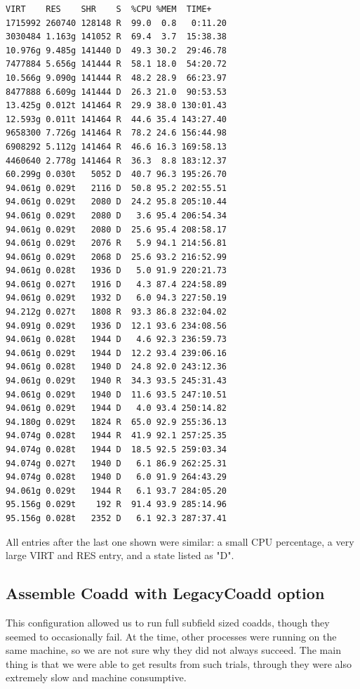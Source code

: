 \documentclass[DM,toc]{lsstdoc}
\begin{document}
\begin{small}
\begin{verbatim}
VIRT    RES    SHR    S  %CPU %MEM  TIME+
1715992 260740 128148 R  99.0  0.8   0:11.20
3030484 1.163g 141052 R  69.4  3.7  15:38.38
10.976g 9.485g 141440 D  49.3 30.2  29:46.78
7477884 5.656g 141444 R  58.1 18.0  54:20.72
10.566g 9.090g 141444 R  48.2 28.9  66:23.97
8477888 6.609g 141444 D  26.3 21.0  90:53.53
13.425g 0.012t 141464 R  29.9 38.0 130:01.43
12.593g 0.011t 141464 R  44.6 35.4 143:27.40
9658300 7.726g 141464 R  78.2 24.6 156:44.98
6908292 5.112g 141464 R  46.6 16.3 169:58.13
4460640 2.778g 141464 R  36.3  8.8 183:12.37
60.299g 0.030t   5052 D  40.7 96.3 195:26.70
94.061g 0.029t   2116 D  50.8 95.2 202:55.51
94.061g 0.029t   2080 D  24.2 95.8 205:10.44
94.061g 0.029t   2080 D   3.6 95.4 206:54.34
94.061g 0.029t   2080 D  25.6 95.4 208:58.17
94.061g 0.029t   2076 R   5.9 94.1 214:56.81
94.061g 0.029t   2068 D  25.6 93.2 216:52.99
94.061g 0.028t   1936 D   5.0 91.9 220:21.73
94.061g 0.027t   1916 D   4.3 87.4 224:58.89
94.061g 0.029t   1932 D   6.0 94.3 227:50.19
94.212g 0.027t   1808 R  93.3 86.8 232:04.02
94.091g 0.029t   1936 D  12.1 93.6 234:08.56
94.061g 0.028t   1944 D   4.6 92.3 236:59.73
94.061g 0.029t   1944 D  12.2 93.4 239:06.16
94.061g 0.028t   1940 D  24.8 92.0 243:12.36
94.061g 0.029t   1940 R  34.3 93.5 245:31.43
94.061g 0.029t   1940 D  11.6 93.5 247:10.51
94.061g 0.029t   1944 D   4.0 93.4 250:14.82
94.180g 0.029t   1824 R  65.0 92.9 255:36.13
94.074g 0.028t   1944 R  41.9 92.1 257:25.35
94.074g 0.028t   1944 D  18.5 92.5 259:03.34
94.074g 0.027t   1940 D   6.1 86.9 262:25.31
94.074g 0.028t   1940 D   6.0 91.9 264:43.29
94.061g 0.029t   1944 R   6.1 93.7 284:05.20
95.156g 0.029t    192 R  91.4 93.9 285:14.96
95.156g 0.028t   2352 D   6.1 92.3 287:37.41
\end{verbatim}
\end{small}

All entries after the last one shown were similar: a small CPU percentage, a very large VIRT and RES entry, and a state listed as "D".

\subsection{Assemble Coadd with LegacyCoadd option}
This configuration allowed us to run full subfield sized coadds, though they seemed to occasionally fail. At the time, other processes were running on the same machine, so we are not sure why they did not always succeed. The main thing is that we were able to get results from such trials, through they were also extremely slow and machine consumptive.
\end{document}

